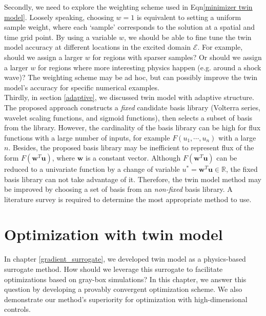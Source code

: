 \documentclass[a4paper,onecolumn]{article}
\theoremstyle{remark}
\begin{document}
\noindent Secondly, we need to explore the weighting scheme used in Eqn\eqref{minimizer twin model}.
Loosely speaking, choosing $w=1$ is equivalent to setting a uniform sample weight, where each `sample'
corresponds to the solution at a spatial and time grid point.
By using a variable $w$, we should be able to fine tune the twin model accuracy at different locations
in the excited domain $\mathcal{E}$. For example, should we assign a larger $w$
for regions with sparser samples? Or should we assign a larger $w$ for regions where
more interesting physics happen (e.g. around a shock wave)?
The weighting scheme may be ad hoc, but can possibly 
improve the twin model's accuracy for specific numerical examples.\\


\noindent Thirdly, in section \ref{adaptive}, we discussed twin model with adaptive structure.
The proposed approach constructs a \emph{fixed} candidate basis library 
(Volterra series, wavelet scaling functions, and sigmoid functions), then selects a subset of basis
from the library.
However, the cardinality of the basis library can be high for flux functions with a large number
of inputs, for example $F(u_1,\cdots,u_n)$ with a large $n$. Besides, the proposed basis
library may be inefficient to represent flux of the form $F(\mathbf{w}^T \mathbf{u})$, where 
$\mathbf{w}$ is
a constant vector. Although $F(\mathbf{w}^T \mathbf{u})$ can be reduced to a univariate
function by a change of variable $u^* = \mathbf{w}^T \mathbf{u} \in\mathbb{R}$, 
the fixed basis library 
can not take advantage of it.
Therefore, the twin model method may be improved by choosing 
a set of basis from an \emph{non-fixed} basis library.
A literature survey is required 
to determine the most appropriate method to use.

\newpage
\section{Optimization with twin model}
\noindent In chapter \ref{gradient_surrogate},
we developed twin model as a physics-based surrogate method.
How should we leverage this surrogate to facilitate optimizations based on gray-box simulations?
In this chapter, we answer this question by developing a provably convergent optimization scheme.
We also demonstrate our method's superiority for optimization with high-dimensional controls.\\
\end{document}
